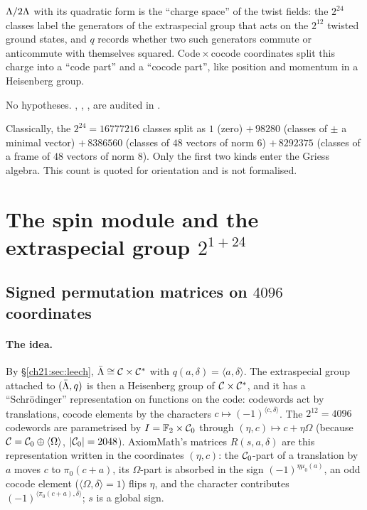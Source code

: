 \begin{physics}
${\Lambda}/2{\Lambda}$ with its quadratic form is the ``charge space'' of the twist fields: the
$2^{24}$ classes label the generators of the extraspecial group that acts on the $2^{12}$ twisted
ground states, and $q$ records whether two such generators commute or anticommute with themselves
squared.  Code${}\times{}$cocode coordinates split this charge into a ``code part'' and a ``cocode
part'', like position and momentum in a Heisenberg group.
\end{physics}
\begin{status}
No hypotheses.  , , ,
 are audited in .
\end{status}

\begin{remark}\label{ch21:rem:classes}
Classically, the $2^{24}=16777216$ classes split as $1$ (zero) $+\,98280$ (classes of $\pm$ a minimal
vector) $+\,8386560$ (classes of $48$ vectors of norm $6$) $+\,8292375$ (classes of a frame of $48$
vectors of norm $8$).  Only the first two kinds enter the Griess algebra.  This count is quoted for
orientation and is not formalised.
\end{remark}

\section{The spin module and the extraspecial group \texorpdfstring{$2^{1+24}$}{2\^{}(1+24)}}\label{ch21:sec:spin}

\subsection{Signed permutation matrices on \texorpdfstring{$4096$}{4096} coordinates}

\paragraph{The idea.}  By \S\ref{ch21:sec:leech}, $\bar{\Lambda}\cong\mathcal{C}\times\mathcal{C}^*$ with
$q(a,\delta)=\langle a,\delta\rangle$.  The extraspecial group attached to $(\bar{\Lambda},q)$ is then a
Heisenberg group of $\mathcal{C}\times\mathcal{C}^*$, and it has a ``Schr\"odinger'' representation on functions
on the code: codewords act by translations, cocode elements by the characters
$c\mapsto(-1)^{\langle c,\delta\rangle}$.  The $2^{12}=4096$ codewords are parametrised by
$I=\mathbb{F}_2\times\mathcal{C}_0$ through $(\eta,c)\mapsto c+\eta\Omega$ (because
$\mathcal{C}=\mathcal{C}_0\oplus\langle\Omega\rangle$, $|\mathcal{C}_0|=2048$).  AxiomMath's matrices $R(s,a,\delta)$ are
this representation written in the coordinates $(\eta,c)$: the $\mathcal{C}_0$-part of a translation by $a$
moves $c$ to $\pi_0(c+a)$, its $\Omega$-part is absorbed in the sign $(-1)^{\eta\mu_0(a)}$, an odd cocode
element ($\langle\Omega,\delta\rangle=1$) flips $\eta$, and the character contributes
$(-1)^{\langle\pi_0(c+a),\delta\rangle}$; $s$ is a global sign.

